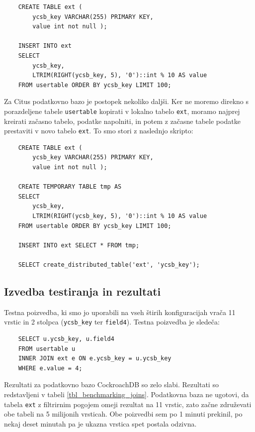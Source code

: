 \documentclass[a4paper, 12pt]{book}
\begin{document}
\begin{listing}[H]
\begin{verbatim}
    CREATE TABLE ext (
        ycsb_key VARCHAR(255) PRIMARY KEY,
        value int not null );

    INSERT INTO ext
    SELECT
        ycsb_key,
        LTRIM(RIGHT(ycsb_key, 5), '0')::int % 10 AS value
    FROM usertable ORDER BY ycsb_key LIMIT 100;
\end{verbatim}
\label{benchmarking_joins_data}
\end{listing}

Za Citus podatkovno bazo je postopek nekoliko daljši. Ker ne moremo direkno s porazdeljene tabele \texttt{usertable} kopirati v lokalno tabelo \texttt{ext}, moramo najprej kreirati začasno tabelo, podatke napolniti, in potem z začasne tabele podatke prestaviti v novo tabelo \texttt{ext}. To smo stori z naslednjo skripto:

\begin{listing}[H]
\begin{verbatim}
    CREATE TABLE ext (
        ycsb_key VARCHAR(255) PRIMARY KEY,
        value int not null );

    CREATE TEMPORARY TABLE tmp AS
    SELECT
        ycsb_key,
        LTRIM(RIGHT(ycsb_key, 5), '0')::int % 10 AS value
    FROM usertable ORDER BY ycsb_key LIMIT 100;

    INSERT INTO ext SELECT * FROM tmp;

    SELECT create_distributed_table('ext', 'ycsb_key');
\end{verbatim}
\label{benchmarking_joins_citus_data}
\end{listing}

\subsection{Izvedba testiranja in rezultati}
Testna poizvedba, ki smo jo uporabili na vseh štirih konfiguracijah vrača 11 vrstic in 2 stolpca (\texttt{ycsb\_key} ter \texttt{field4}). Testna poizvedba je sledeča:

\begin{listing}[H]
\begin{verbatim}
    SELECT u.ycsb_key, u.field4
    FROM usertable u
    INNER JOIN ext e ON e.ycsb_key = u.ycsb_key
    WHERE e.value = 4; 
\end{verbatim}
\label{benchmarking_joins_query}
\end{listing}

Rezultati za podatkovno bazo CockroachDB so zelo slabi. Rezultati so redstavljeni v tabeli \ref{tbl_benchmarking_joins}. Podatkovna baza ne ugotovi, da tabela \texttt{ext} z filtrirnim pogojem omeji rezultat na 11 vrstic, zato začne združevati obe tabeli na 5 milijonih vrsticah. Obe poizvedbi sem po 1 minuti prekinil, po nekaj deset minutah pa je ukazna vrstica spet postala odzivna.
\end{document}
